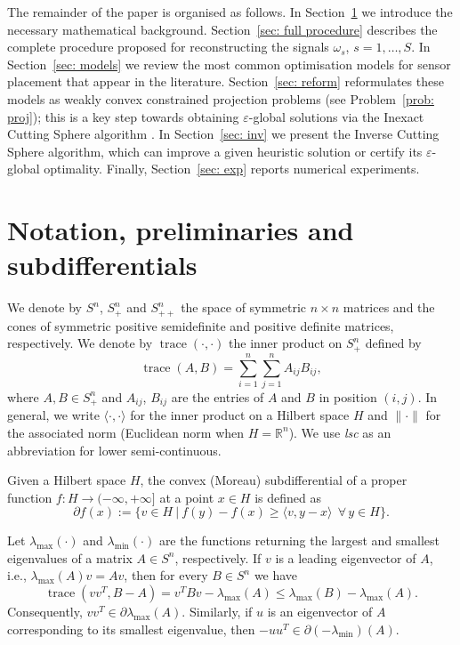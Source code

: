 \documentclass[12pt]{amsart}
\theoremstyle{plain}
\theoremstyle{definition}
\begin{document}
The remainder of the paper is organised as follows. In Section~\ref{sec: not} we introduce the necessary mathematical background. Section~\ref{sec: full procedure} describes the complete procedure proposed for reconstructing the signals $\omega_s$, $s = 1, \dots, S$. In Section~\ref{sec: models} we review the most common optimisation models for sensor placement that appear in the literature. Section~\ref{sec: reform} reformulates these models as weakly convex constrained projection problems (see Problem~\ref{prob: proj}); this is a key step towards obtaining $\varepsilon$-global solutions via the Inexact Cutting Sphere algorithm \cite[Algorithm 3]{bednarczuk2026outer}. In Section~\ref{sec: inv} we present the Inverse Cutting Sphere algorithm, which can improve a given heuristic solution or certify its $\varepsilon$-global optimality. Finally, Section~\ref{sec: exp} reports numerical experiments.
		
		
		
		\section{Notation, preliminaries and subdifferentials}
\label{sec: not}

We denote by $S^n$, $S_+^n$ and $S_{++}^n$ the space of symmetric $n\times n$ matrices and the cones of symmetric positive semidefinite and positive definite matrices, respectively. We denote by $\operatorname{trace}(\cdot,\cdot)$ the inner product on $S_+^n$ defined by
\[
\operatorname{trace}(A,B) = \sum_{i=1}^n \sum_{j=1}^n A_{ij} B_{ij},
\]
where $A,B\in S_+^n$ and $A_{ij}$, $B_{ij}$ are the entries of $A$ and $B$ in position $(i,j)$. In general, we write $\langle \cdot,\cdot\rangle$ for the inner product on a Hilbert space $H$ and $\|\cdot\|$ for the associated norm (Euclidean norm when $H=\mathbb{R}^n$). We use \emph{lsc} as an abbreviation for lower semi-continuous.

Given a Hilbert space $H$, the convex (Moreau) subdifferential of a proper function $f:H\to (-\infty,+\infty]$ at a point $x\in H$ is defined as \cite[Definition 16.1]{bauschke2017convex}
\begin{equation}
\partial f(x) := \bigl\{ v\in H \ \big|\  f(y)-f(x) \ge \langle v,y-x\rangle \ \ \forall\, y\in H \bigr\}.
\end{equation}

Let $\lambda_{\max}(\cdot)$ and $\lambda_{\min}(\cdot)$ are the functions returning the largest and smallest eigenvalues of a matrix $A\in S^n$, respectively. If $v$ is a leading eigenvector of $A$, i.e., $\lambda_{\max}(A)v=Av$, then for every $B\in S^n$ we have
\[
\operatorname{trace}(vv^T,B-A) = v^TBv - \lambda_{\max}(A) \le \lambda_{\max}(B)-\lambda_{\max}(A).
\]
Consequently, $vv^T\in\partial\lambda_{\max}(A)$. Similarly, if $u$ is an eigenvector of $A$ corresponding to its smallest eigenvalue, then $-uu^T\in\partial(-\lambda_{\min})(A)$.
\end{document}
